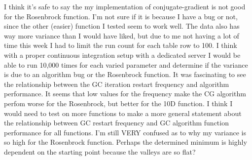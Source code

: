 \documentclass[11pt]{article}
\begin{document}
\begin{enumerate}
I think it's safe to say the my implementation of conjugate-gradient is not good for the Rosenbrock function. I'm not sure if it is because I have a bug or not, since the other (easier) function I tested seem to work well. The data also has way more variance than I would have liked, but due to me not having a lot of time this week I had to limit the run count for each table row to 100. I think with a proper continuous integration setup with a dedicated server I would be able to run 10,000 times for each varied parameter and determine if the variance is due to an algorithm bug or the Rosenbrock function. It was fascinating to see the relationship between the GC iteration restart frequency and algorithm performance. It seems that low values for the frequency make the CG algorithm perfom worse for the Rosenbrock, but better for the 10D function. I think I would need to test on more functions to make a more general statement about the relationship between GC restart frequency and GC algorithm function performance for all functions. I'm still VERY confused as to why my variance is so high for the Rosenbrock function. Perhaps the determined minimum is highly dependent on the starting point because the valleys are so flat?
\end{enumerate}
\end{document}
